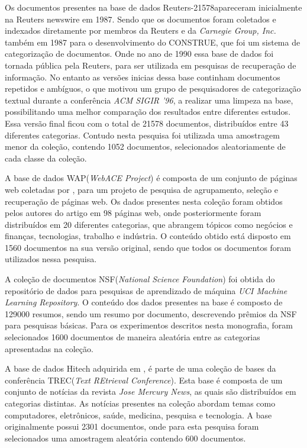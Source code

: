 Os documentos presentes na base de dados Reuters-21578\footnotemark apareceram inicialmente na Reuters newswire
em 1987. Sendo que os documentos foram coletados e indexados diretamente por membros da Reuters e da
{\it Carnegie Group, Inc.} também em 1987 para o desenvolvimento do CONSTRUE\cite{Hayes1990}, que
foi um sistema de categorização de documentos. Onde no ano de 1990 essa base de dados foi tornada
pública pela Reuters, para ser utilizada em pesquisas de recuperação de informação. No entanto as
versões inicias dessa base continham documentos repetidos e ambíguos, o que motivou um grupo de
pesquisadores de categorização textual durante a conferência {\it ACM SIGIR '96\/}, a realizar uma
limpeza na base, possibilitando uma melhor comparação dos resultados entre diferentes estudos. Essa
versão final ficou com o total de 21578 documentos, distribuídos entre 43 diferentes categorias. 
Contudo
nesta pesquisa foi utilizada uma amostragem menor da coleção, contendo 1052 documentos, selecionados
aleatoriamente de cada classe da coleção.

A base de dados WAP({\it WebACE Project\/}) é composta de um conjunto de páginas web coletadas por 
, para um projeto de pesquisa de agrupamento, seleção e recuperação de páginas web.
Os dados presentes nesta coleção foram obtidos pelos autores do artigo em 98 páginas web, onde
posteriormente foram distribuídos em 20 diferentes categorias, que abrangem tópicos como negócios e 
finanças, tecnologias, trabalho e
indústria. O conteúdo obtido está disposto em 1560 documentos na sua versão original, sendo que
todos os documentos foram utilizados nessa pesquisa.

A coleção de documentos NSF\footnotemark({\it National Science Foundation\/}) foi obtida do 
repositório de dados para pesquisas de aprendizado de máquina 
{\it UCI Machine Learning Repository}\cite{Frank2010}. O conteúdo dos dados presentes na base é
composto de 129000 resumos, sendo um resumo por documento, descrevendo prêmios da NSF para 
pesquisas básicas. Para os experimentos descritos nesta monografia, foram selecionados 1600 
documentos de maneira aleatória entre as categorias apresentadas na coleção.

A base de dados Hitech adquirida em , é parte de uma coleção de bases da 
conferência TREC({\it Text REtrieval Conference\/})\footnotemark. 
Esta base é composta de um conjunto de notícias da revista {\it Jose Mercury News\/}\footnotemark, 
as quais são distribuídos em categorias distintas. As notícias presentes na coleção
abordam temas como computadores, eletrônicos, saúde, medicina, pesquisa e tecnologia. 
A base originalmente possui 2301
documentos, onde para esta pesquisa foram selecionados uma amostragem aleatória contendo 600
documentos. 

